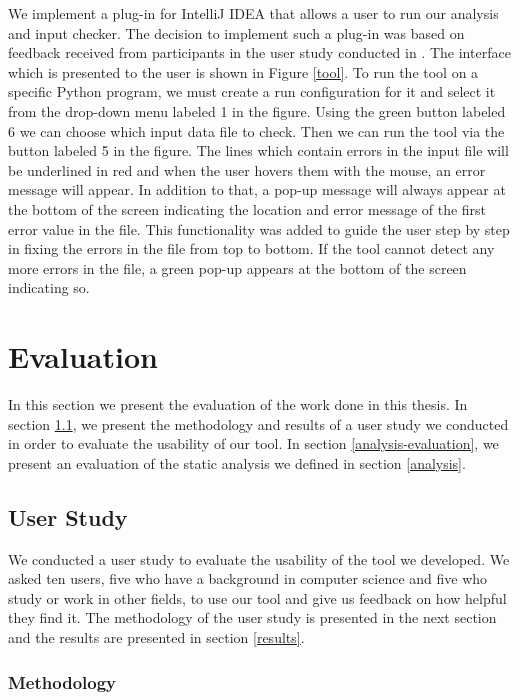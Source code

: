 \documentclass[10pt]{report}
\begin{document}
We implement a plug-in for IntelliJ IDEA that allows a user to run our analysis and input checker. The decision to implement such a plug-in was based on feedback received from participants in the user study conducted in \cite{madelin}. The interface which is presented to the user is shown in Figure \ref{tool}. To run the tool on a specific Python program, we must create a run configuration for it and select it from the drop-down menu labeled 1 in the figure. Using the green button labeled 6 we can choose which input data file to check. Then we can run the tool via the button labeled 5 in the figure. The lines which contain errors in the input file will be underlined in red and when the user hovers them with the mouse, an error message will appear. In addition to that, a pop-up message will always appear at the bottom of the screen indicating the location and error message of the first error value in the file. This functionality was added to guide the user step by step in fixing the errors in the file from top to bottom. If the tool cannot detect any more errors in the file, a green pop-up appears at the bottom of the screen indicating so. 
  

\chapter{Evaluation} \label{evaluation}

In this section we present the evaluation of the work done in this thesis. In section \ref{user-study}, we present the methodology and results of a user study we conducted in order to evaluate the usability of our tool. In section \ref{analysis-evaluation}, we present an evaluation of the static analysis we defined in section \ref{analysis}. 

\section{User Study} \label{user-study}
We conducted a user study to evaluate the usability of the tool we developed. We asked ten users, five who have a background in computer science and five who study or work in other fields, to use our tool and give us feedback on how helpful they find it. The methodology of the user study is presented in the next section and the results are presented in section \ref{results}. 

\subsection{Methodology} \label{methodology}
\end{document}
